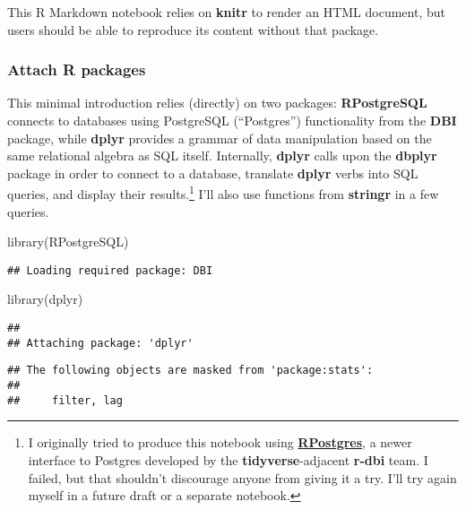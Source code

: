 \documentclass[
]{article}
\newenvironment{Shaded}{\begin{snugshade}}{\end{snugshade}}
\newcommand{\FunctionTok}[1]{\textcolor[rgb]{0.00,0.00,0.00}{#1}}
\newcommand{\NormalTok}[1]{#1}
\begin{document}
This R Markdown notebook relies on \textbf{knitr} to render an HTML
document, but users should be able to reproduce its content without that
package.

\hypertarget{attach-r-packages}{%
\subsubsection{Attach R packages}\label{attach-r-packages}}

This minimal introduction relies (directly) on two packages:
\textbf{RPostgreSQL} connects to databases using PostgreSQL
(``Postgres'') functionality from the \textbf{DBI} package, while
\textbf{dplyr} provides a grammar of data manipulation based on the same
relational algebra as SQL itself. Internally, \textbf{dplyr} calls upon
the \textbf{dbplyr} package in order to connect to a database, translate
\textbf{dplyr} verbs into SQL queries, and display their
results.\footnote{I originally tried to produce this notebook using
  \href{https://github.com/r-dbi/RPostgres}{\textbf{RPostgres}}, a newer
  interface to Postgres developed by the \textbf{tidyverse}-adjacent
  \textbf{r-dbi} team. I failed, but that shouldn't discourage anyone
  from giving it a try. I'll try again myself in a future draft or a
  separate notebook.} I'll also use functions from \textbf{stringr} in a
few queries.

\begin{Shaded}
\begin{Highlighting}[]
\FunctionTok{library}\NormalTok{(RPostgreSQL)}
\end{Highlighting}
\end{Shaded}

\begin{verbatim}
## Loading required package: DBI
\end{verbatim}

\begin{Shaded}
\begin{Highlighting}[]
\FunctionTok{library}\NormalTok{(dplyr)}
\end{Highlighting}
\end{Shaded}

\begin{verbatim}
## 
## Attaching package: 'dplyr'
\end{verbatim}

\begin{verbatim}
## The following objects are masked from 'package:stats':
## 
##     filter, lag
\end{verbatim}
\end{document}

